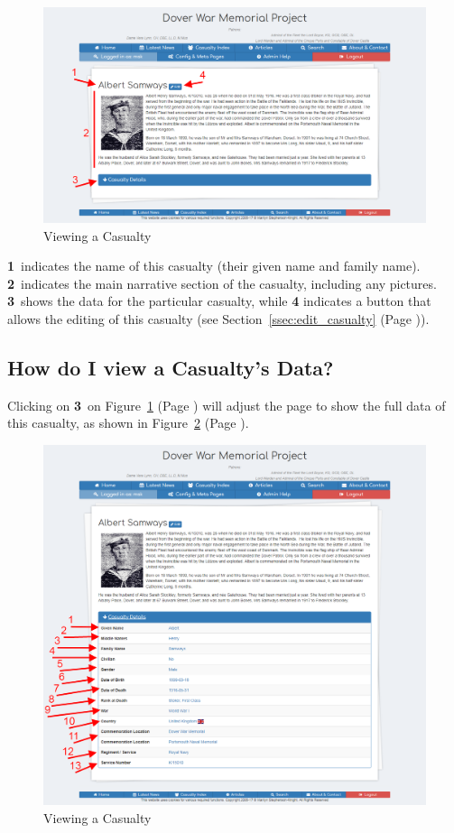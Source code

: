 \documentclass[12pt]{article}
\newcommand{\marker}[1]{\color{red}\textbf{#1}\color{black}}
\newcommand{\myref}[1]{\ref{#1} {\scriptsize(Page \pageref{#1})}}
\begin{document}
\begin{figure}[h]
  \centering
 \includegraphics[width=.9\textwidth]{pics/view_casualty.png}
	\caption{Viewing a Casualty}\label{fig:view_casualty}
\end{figure}

\marker{1}\ indicates the name of this casualty (their given name and family name). \marker{2}\ indicates the main narrative section of the casualty, including any pictures. \marker{3}\ shows the data for the particular casualty, while \marker{4} indicates a button that allows the editing of this casualty (see Section~\myref{ssec:edit_casualty}).

\newpage
\FloatBarrier
\subsection{How do I view a Casualty's Data?}\label{ssec:view_casualty_data}
Clicking on \marker{3}\ on Figure~\myref{fig:view_casualty} will adjust the page to show the full data of this casualty, as shown in Figure~\myref{fig:view_casualty_data}.

\begin{figure}[h]
  \centering
 \includegraphics[width=.9\textwidth]{pics/view_casualty_data.png}
	\caption{Viewing a Casualty}\label{fig:view_casualty_data}
\end{figure}
\end{document}

